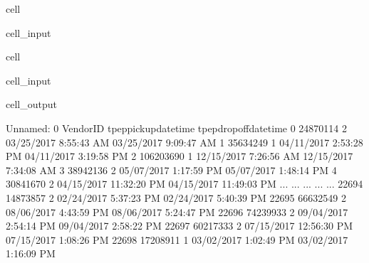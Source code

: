 \documentclass[letterpaper,10pt,english]{sphinxmanual}
\begin{document}
\begin{sphinxuseclass}{cell}
\begin{sphinxuseclass}{cell_input}
\begin{sphinxVerbatim}[commandchars=\\\{\}]
  
\end{sphinxVerbatim}

\end{sphinxuseclass}
\end{sphinxuseclass}
\begin{sphinxuseclass}{cell}
\begin{sphinxuseclass}{cell_input}
\begin{sphinxVerbatim}[commandchars=\\\{\}]
\end{sphinxVerbatim}

\end{sphinxuseclass}
\begin{sphinxuseclass}{cell_output}
\begin{sphinxVerbatim}[commandchars=\\\{\}]
       Unnamed: 0  VendorID    tpep\PYGZus{}pickup\PYGZus{}datetime   tpep\PYGZus{}dropoff\PYGZus{}datetime  \PYGZbs{}
0        24870114         2   03/25/2017 8:55:43 AM   03/25/2017 9:09:47 AM   
1        35634249         1   04/11/2017 2:53:28 PM   04/11/2017 3:19:58 PM   
2       106203690         1   12/15/2017 7:26:56 AM   12/15/2017 7:34:08 AM   
3        38942136         2   05/07/2017 1:17:59 PM   05/07/2017 1:48:14 PM   
4        30841670         2  04/15/2017 11:32:20 PM  04/15/2017 11:49:03 PM   
...           ...       ...                     ...                     ...   
22694    14873857         2   02/24/2017 5:37:23 PM   02/24/2017 5:40:39 PM   
22695    66632549         2   08/06/2017 4:43:59 PM   08/06/2017 5:24:47 PM   
22696    74239933         2   09/04/2017 2:54:14 PM   09/04/2017 2:58:22 PM   
22697    60217333         2  07/15/2017 12:56:30 PM   07/15/2017 1:08:26 PM   
22698    17208911         1   03/02/2017 1:02:49 PM   03/02/2017 1:16:09 PM   


\end{sphinxVerbatim}
\end{sphinxuseclass}
\end{sphinxuseclass}
\end{document}
